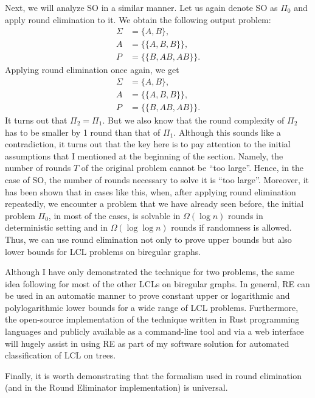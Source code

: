 Next, we will analyze SO in a similar manner. Let us again denote SO as $\Pi_0$ and apply
round elimination to it. We obtain the following output problem:
\begin{align*}
\Sigma &= \{A, B\}, \\
A &= \{ \{A, B, B\} \}, \\
P &= \{ \{B, AB, AB\}\}.
\end{align*}
Applying round elimination once again, we get
\begin{align*}
\Sigma &= \{A, B\}, \\
A &= \{ \{A, B, B\} \}, \\
P &= \{ \{B, AB, AB\}\}.
\end{align*}
It turns out that $\Pi_2 = \Pi_1$. But we also know that
the round complexity of $\Pi_2$
has to be smaller by 1 round than that of $\Pi_1$. Although this sounds like a contradiction,
it turns out that the key here is to pay attention to the initial assumptions that I mentioned at the
beginning of the section. Namely, the number of rounds $T$ of the original problem cannot be ``too large''.
Hence, in the case of SO, the number of rounds necessary to solve it is ``too large''. Moreover,
it has been shown that in cases like this, when, after applying round elimination repeatedly,
we encounter a problem that we have already seen before, the initial problem $\Pi_0$, in most of the cases,
is solvable in $\Omega(\log n)$ rounds in deterministic setting and in $\Omega(\log \log n)$ rounds
if randomness is allowed. Thus, we can use round elimination not only to prove upper bounds but
also lower bounds for LCL problems on biregular graphs.

Although I have only demonstrated the technique for two problems, the same idea following for most of the
other LCLs on biregular graphs. In general, RE can be used in an automatic manner to prove constant upper or
logarithmic and polylogarithmic lower bounds for a wide range of LCL problems. Furthermore, the open-source
implementation
of the technique written in Rust programming languages and publicly available as a command-line tool and via
a web interface will hugely assist in using RE as part of my software solution for automated classification
of LCL on trees.

Finally, it is worth demonstrating that the formalism used in round
elimination (and in the Round Eliminator implementation) is universal.

